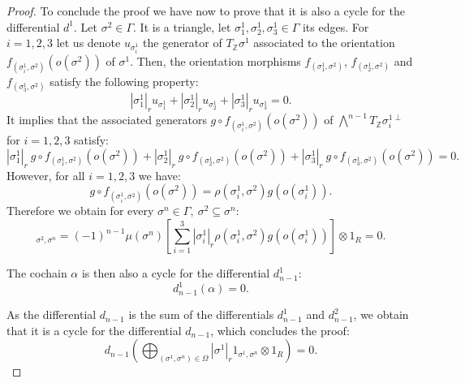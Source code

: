 \documentclass{article}
\begin{document}
\begin{proof}
    To conclude the proof we have now to prove that it is also a cycle for the differential $d^{1}$. Let $\sigma^2 \in \Gamma$. It is a triangle, let $\sigma^1_1,\sigma^1_2,\sigma^1_3 \in \Gamma$ its edges. For $i=1,2,3$ let us denote $u_{\sigma^1_i}$ the generator of $T_{\mathbb{Z}}\sigma^1$ associated to the orientation $f_{(\sigma^1_i,\sigma^2)}(o(\sigma^2))$ of $\sigma^1$. Then, the orientation morphisms $f_{(\sigma^1_1,\sigma^2)}$, $f_{(\sigma^1_2,\sigma^2)}$ and $f_{(\sigma^1_3,\sigma^2)}$ satisfy the following property:
    \begin{equation*}
        |\sigma^1_1|_ru_{\sigma^1_1} + |\sigma^1_2|_ru_{\sigma^1_2} + |\sigma^1_3|_ru_{\sigma^1_3} = 0.
    \end{equation*}
    It implies that the associated generators $g \circ f_{(\sigma^1_i,\sigma^2)}(o(\sigma^2))$ of $\bigwedge^{n-1}T_{\mathbb{Z}}\sigma^{1\perp}_i$ for $i = 1,2,3$ satisfy:
    \begin{equation*}
        |\sigma^1_1|_r~g \circ f_{(\sigma^1_1,\sigma^2)}(o(\sigma^2)) + |\sigma^1_2|_r~g \circ f_{(\sigma^1_2,\sigma^2)}(o(\sigma^2)) + |\sigma^1_3|_r~g \circ f_{(\sigma^1_3,\sigma^2)}(o(\sigma^2)) = 0.
    \end{equation*}
    However, for all $i=1,2,3$ we have:
    \begin{equation*}
        g \circ f_{(\sigma^1_i,\sigma^2)}(o(\sigma^2)) = \rho(\sigma^1_i,\sigma^2)g(o(\sigma^1_i)).
    \end{equation*}
    Therefore we obtain for every $\sigma^n \in \Gamma, ~\sigma^2 \subseteq \sigma^n$:
    \begin{equation*}
        [d^{1}_{n-1}(\alpha)]_{\sigma^2,\sigma^n} = (-1)^{n-1}\mu(\sigma^n)\left [ \sum_{i=1}^3|\sigma^1_i|_r\rho(\sigma^1_i,\sigma^2)g(o(\sigma^1_i)) \right ] \otimes 1_R = 0.
    \end{equation*}

    The cochain $\alpha$ is then also a cycle for the differential $d^{1}_{n-1}$:
    \begin{equation*}
        d^{1}_{n-1}(\alpha) = 0.
    \end{equation*}
    
    As the differential $d_{n-1}$ is the sum of the differentials $d^{1}_{n-1}$ and $d^{2}_{n-1}$, we obtain that it is a cycle for the differential $d_{n-1}$, which concludes the proof:
    \begin{equation*}
        d_{n-1}\left ( \bigoplus_{(\sigma^1,\sigma^n) \in \Omega} |\sigma^1|_r1_{\sigma^1,\sigma^n} \otimes 1_R \right ) = 0.
    \end{equation*}
\end{proof}
\end{document}
